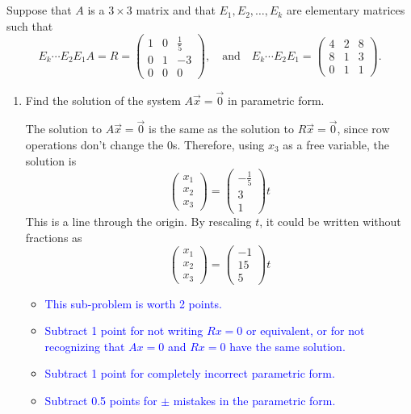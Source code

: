 \documentclass[10pt,twoside]{article}
\begin{document}
\section{ }
{\color{red}Suppose that $A$ is a $3 \times 3$ matrix and that $E_1, E_2, \ldots, E_k$ are
elementary matrices such that 
\[ 
 E_k \cdots E_2 E_1 A =  R = \begin{pmatrix}
1 & 0 & \frac15\\
0 & 1 & -3\\
0 & 0 & 0
\end{pmatrix},\quad\text{and}\quad
E_k \cdots E_2 E_1 
=
 \begin{pmatrix}
4 & 2 & 8\\
8 & 1 & 3\\
0 & 1 & 1
\end{pmatrix}.
\]}
\begin{enumerate}
\item
{\color{red}Find the solution of the system $A\vec{x}=\vec{0}$ in parametric form.}

The solution to $A\vec{x}=\vec{0}$ is the same as the solution to $R \vec{x} =
\vec{0}$, since row operations don't change the 0s.  Therefore, using $x_3$ as
a free variable, the solution is
\[ 
\begin{pmatrix}
x_1\\x_2\\x_3
\end{pmatrix}
= \begin{pmatrix}
- \frac15 \\ 3 \\ 1\end{pmatrix}t
\]
This is a line through the origin.  By rescaling $t$, it could be written
without fractions as
\[ 
\begin{pmatrix}
x_1\\x_2\\x_3
\end{pmatrix}
= \begin{pmatrix}
- 1 \\ 15 \\ 5\end{pmatrix}t
\]


\begin{itemize}
\item\textcolor{blue}{This sub-problem is worth 2 points.}
\item\textcolor{blue}{Subtract 1 point for not writing $Rx=0$ or equivalent, or
for not recognizing that $Ax=0$ and $Rx=0$ have the same solution.}
\item\textcolor{blue}{Subtract 1 point for completely incorrect parametric
form.}
\item\textcolor{blue}{Subtract 0.5 points for $\pm$ mistakes in the
parametric form.}
\end{itemize}



\end{enumerate}
\end{document}
